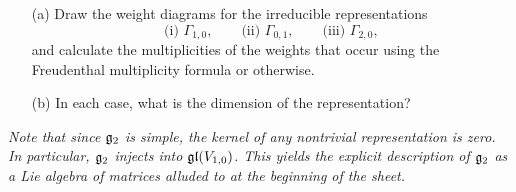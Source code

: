 \documentclass[12pt]{article}
\begin{document}
\bigskip

\begin{question}
\begin{enumerate}
\item[(a)] Draw the weight diagrams for the irreducible representations
\[\mbox{(i) }\Gamma_{1,0},\qquad\mbox{(ii) }\Gamma_{0,1},\qquad\mbox{(iii) }\Gamma_{2,0},\]
and calculate the multiplicities of the weights that occur using the Freudenthal multiplicity formula or otherwise.
\item[(b)] In each case, what is the dimension of the representation?
\end{enumerate}

{\em Note that since $\mathfrak{g}_2$ is simple, the kernel of any nontrivial representation is zero. In particular, $\mathfrak{g}_2$ injects into $\mathfrak{gl}(V_{1,0})$. This yields the explicit description of $\mathfrak{g}_2$ as a Lie algebra of matrices alluded to at the beginning of the sheet.}
\end{question}
\end{document}

